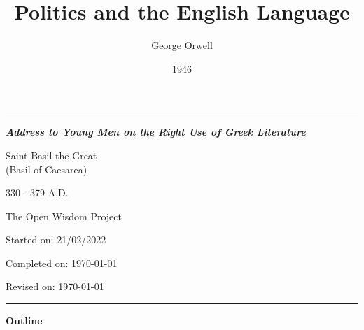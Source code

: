 \documentclass[a4paper]{article}
\title{Politics and the English Language}
\author{George Orwell}
\date{1946}
\begin{document}
\begin{titlepage}

 \hrule
 
  \vspace*{120pt}%
  
  \centering

  \HUGE \textbf{\textit{Address to Young Men on the Right Use of Greek Literature}}

  \bigskip

  \LARGE Saint Basil the Great \smallskip \\ 
  \normalsize (Basil of Caesarea) %

  \smallskip

  \large 330 - 379 A.D. %

  \vspace{250pt}%

  \normalsize
  The Open Wisdom Project
  \footnotesize
  
  Started on: 21/02/2022
  
  Completed on: \today
  
  Revised on: \today
  
  \vfill
  
  \hrule
\end{titlepage}

\normalsize

\begin{center}
 \textbf{Outline}
\end{center}
\end{document}
